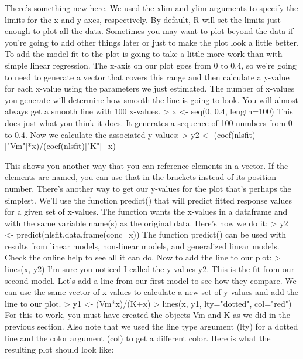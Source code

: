 {%
There's something new here. We used the xlim and ylim arguments to specify the limits for the x and y axes, respectively. By default, R will set the limits just enough to plot all the data. Sometimes you may want to plot beyond the data if you're going to add other things later or just to make the plot look a little better. 
To add the model fit to the plot is going to take a little more work than with simple linear regression. The x-axis on our plot goes from 0 to 0.4, so we're going to need to generate a vector that covers this range and then calculate a y-value for each x-value using the parameters we just estimated. The number of x-values you generate will determine how smooth the line is going to look. You will almost always get a smooth line with 100 x-values. 
> x <- seq(0, 0.4, length=100)
This does just what you think it does. It generates a sequence of 100 numbers from 0 to 0.4. Now we calculate the associated y-values: 
> y2 <- (coef(nlsfit)["Vm"]*x)/(coef(nlsfit)["K"]+x)


This shows you another way that you can reference elements in a vector. If the elements are named, you can use that in the brackets instead of its position number. There's another way to get our y-values for the plot that's perhaps the simplest. We'll use the function predict() that will predict fitted response values for a given set of x-values. The function wants the x-values in a dataframe and with the same variable name(s) as the original data. Here's how we do it: 
> y2 <- predict(nlsfit,data.frame(conc=x))
The function predict() can be used with results from linear models, non-linear models, and generalized linear models. Check the online help to see all it can do. Now to add the line to our plot: 
> lines(x, y2)
I'm sure you noticed I called the y-values y2. This is the fit from our second model. Let's add a line from our first model to see how they compare. We can use the same vector of x-values to calculate a new set of y-values and add the line to our plot. 
> y1 <- (Vm*x)/(K+x)
> lines(x, y1, lty="dotted", col="red")
For this to work, you must have created the objects Vm and K as we did in the previous section. Also note that we used the line type argument (lty) for a dotted line and the color argument (col) to get a different color. Here is what the resulting plot should look like: 


}
